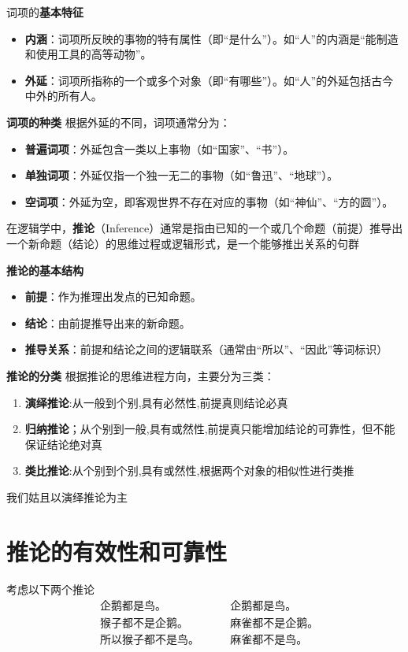 词项的\textbf{基本特征}
\begin{itemize}
	\item \textbf{内涵}：词项所反映的事物的特有属性（即“是什么”）。如“人”的内涵是“能制造和使用工具的高等动物”。
	\item \textbf{外延}：词项所指称的一个或多个对象（即“有哪些”）。如“人”的外延包括古今中外的所有人。
\end{itemize}

\textbf{词项的种类}
根据外延的不同，词项通常分为：
\begin{itemize}
	\item \textbf{普遍词项}：外延包含一类以上事物（如“国家”、“书”）。
	
	\item\textbf{单独词项}：外延仅指一个独一无二的事物（如“鲁迅”、“地球”）。
	\item \textbf{空词项}：外延为空，即客观世界不存在对应的事物（如“神仙”、“方的圆”）。
\end{itemize}
\begin{mydefinition}{}{}
	在逻辑学中，\textbf{推论}（Inference）通常是指由已知的一个或几个命题（前提）推导出一个新命题（结论）的思维过程或逻辑形式，是一个能够推出关系的句群
	
\end{mydefinition}
\textbf{推论的基本结构}
\begin{itemize}
	\item \textbf{前提}：作为推理出发点的已知命题。
	\item \textbf{结论}：由前提推导出来的新命题。
	\item \textbf{推导关系}：前提和结论之间的逻辑联系（通常由“所以”、“因此”等词标识）
\end{itemize}
\textbf{推论的分类}
根据推论的思维进程方向，主要分为三类：
\begin{enumerate}
	\item \textbf{演绎推论}:从一般到个别,具有必然性,前提真则结论必真
	\item \textbf{归纳推论}；从个别到一般,具有或然性,前提真只能增加结论的可靠性，但不能保证结论绝对真
	\item \textbf{类比推论}:从个别到个别,具有或然性,根据两个对象的相似性进行类推
\end{enumerate}
我们姑且以演绎推论为主
\section{推论的有效性和可靠性}
考虑以下两个推论
\begin{equation}\label{例子1}
	\begin{aligned}
		&\text{企鹅都是鸟。}\qquad&\text{企鹅都是鸟。}\\
		&\text{猴子都不是企鹅。}\qquad&\text{麻雀都不是企鹅。}\\
		&\text{所以猴子都不是鸟。}\qquad&\text{麻雀都不是鸟。}
	\end{aligned}
\end{equation}

